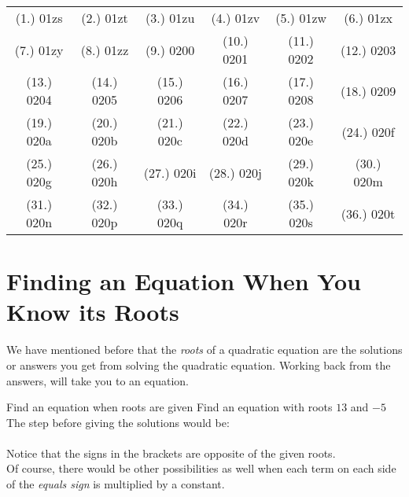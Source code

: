 {%
\par \practiceinfo
\par \begin{tabular}[h]{cccccc}
(1.) 01zs	&
(2.) 01zt	&
(3.) 01zu	&
(4.) 01zv	&
(5.) 01zw	&
(6.) 01zx	\\ %
(7.) 01zy	&
(8.) 01zz	&
(9.) 0200	&
(10.) 0201	&
(11.) 0202	&
(12.) 0203	\\ %
(13.) 0204	&
(14.) 0205	&
(15.) 0206	&
(16.) 0207	&
(17.) 0208	&
(18.) 0209	\\ %
(19.) 020a	&
(20.) 020b	&
(21.) 020c	&
(22.) 020d	&
(23.) 020e	&
(24.) 020f	\\ %
(25.) 020g	&
(26.) 020h	&
(27.) 020i	&
(28.) 020j	&
(29.) 020k	&
(30.) 020m	\\ %
(31.) 020n	&
(32.) 020p	&
(33.) 020q	&
(34.) 020r	&
(35.) 020s	&
(36.) 020t %
\end{tabular}}

\section{Finding an Equation When You Know its Roots}

We have mentioned before that the \textit{roots} of a quadratic equation are the solutions or answers you get from solving the quadratic equation.  Working back from the answers, will take you to an equation.

\begin{wex}{Find an equation when roots are given}
{Find an equation with roots $13$ and $-5$\\}{
The step before giving the solutions would be:\\
\\
Notice that the signs in the brackets are opposite of the given roots.\\
Of course, there would be other possibilities as well when each term on each side of the \textit{equals sign} is multiplied by a constant.}
\end{wex}

